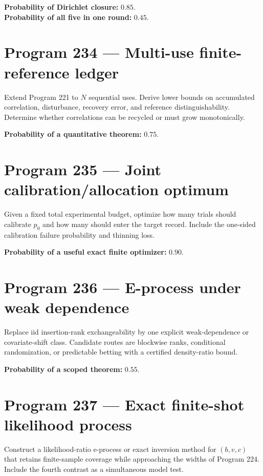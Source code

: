 \documentclass[11pt,a4paper,openany]{report}
\begin{document}
\textbf{Probability of Dirichlet closure:} \(0.85\).\\
\textbf{Probability of all five in one round:} \(0.45\).

\section{Program 234 --- Multi-use finite-reference ledger}

Extend Program 221 to \(N\) sequential uses. Derive lower bounds on accumulated correlation, disturbance, recovery error, and reference distinguishability. Determine whether correlations can be recycled or must grow monotonically.

\textbf{Probability of a quantitative theorem:} \(0.75\).

\section{Program 235 --- Joint calibration/\allowbreak{}allocation optimum}

Given a fixed total experimental budget, optimize how many trials should calibrate \(p_0\) and how many should enter the target record. Include the one-sided calibration failure probability and thinning loss.

\textbf{Probability of a useful exact finite optimizer:} \(0.90\).

\section{Program 236 --- E-process under weak dependence}

Replace iid insertion-rank exchangeability by one explicit weak-dependence or covariate-shift class. Candidate routes are blockwise ranks, conditional randomization, or predictable betting with a certified density-ratio bound.

\textbf{Probability of a scoped theorem:} \(0.55\).

\section{Program 237 --- Exact finite-shot likelihood process}

Construct a likelihood-ratio e-process or exact inversion method for \((b,v,c)\) that retains finite-sample coverage while approaching the widths of Program 224. Include the fourth contrast as a simultaneous model test.
\end{document}
